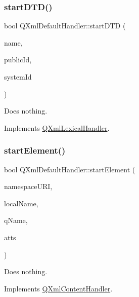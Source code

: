 \subsubsection{\texorpdfstring{startDTD()}{startDTD()}}
{\footnotesize\ttfamily bool Q\+Xml\+Default\+Handler\+::start\+D\+TD (\begin{DoxyParamCaption}\item[{const \mbox{\hyperlink{class_q_string}{Q\+String}} \&}]{name,  }\item[{const \mbox{\hyperlink{class_q_string}{Q\+String}} \&}]{public\+Id,  }\item[{const \mbox{\hyperlink{class_q_string}{Q\+String}} \&}]{system\+Id }\end{DoxyParamCaption})\hspace{0.3cm}{\ttfamily [virtual]}}

Does nothing. 

Implements \mbox{\hyperlink{class_q_xml_lexical_handler_a1bdcb91e384a32b218d04304e1116808}{Q\+Xml\+Lexical\+Handler}}.

\mbox{\label{class_q_xml_default_handler_a0381a337b32a16d2ef2a8df9a29cb215}} 
\subsubsection{\texorpdfstring{startElement()}{startElement()}}
{\footnotesize\ttfamily bool Q\+Xml\+Default\+Handler\+::start\+Element (\begin{DoxyParamCaption}\item[{const \mbox{\hyperlink{class_q_string}{Q\+String}} \&}]{namespace\+U\+RI,  }\item[{const \mbox{\hyperlink{class_q_string}{Q\+String}} \&}]{local\+Name,  }\item[{const \mbox{\hyperlink{class_q_string}{Q\+String}} \&}]{q\+Name,  }\item[{const \mbox{\hyperlink{class_q_xml_attributes}{Q\+Xml\+Attributes}} \&}]{atts }\end{DoxyParamCaption})\hspace{0.3cm}{\ttfamily [virtual]}}

Does nothing. 

Implements \mbox{\hyperlink{class_q_xml_content_handler_af6d4e631fad2b9b75622c95003b1da55}{Q\+Xml\+Content\+Handler}}.



